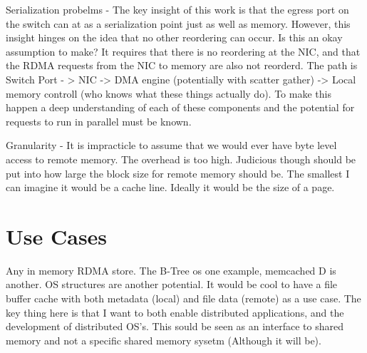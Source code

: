 Serialization probelms - The key insight of this work is that the egress port
on the switch can at as a serialization point just as well as memory.
However, this insight hinges on the idea that no other reordering can occur.
Is this an okay assumption to make? It requires that there is no reordering
at the NIC, and that the RDMA requests from the NIC to memory are also not
reorderd. The path is Switch Port - > NIC -> DMA engine (potentially with
scatter gather) -> Local memory controll (who knows what these things
actually do). To make this happen a deep understanding of each of these
components and the potential for requests to run in parallel must be known.


Granularity - It is impracticle to assume that we would ever have byte level
access to remote memory. The overhead is too high. Judicious though should be
put into how large the block size for remote memory should be. The smallest I
can imagine it would be a cache line. Ideally it would be the size of a page.

\section{Use Cases}

Any in memory RDMA store. The B-Tree os one example, memcached D is another.
OS structures are another potential. It would be cool to have a file buffer
cache with both metadata (local) and file data (remote) as a use case. The
key thing here is that I want to both enable distributed applications, and
the development of distributed OS's. This sould be seen as an interface to
shared memory and not a specific shared memory sysetm (Although it will be).

